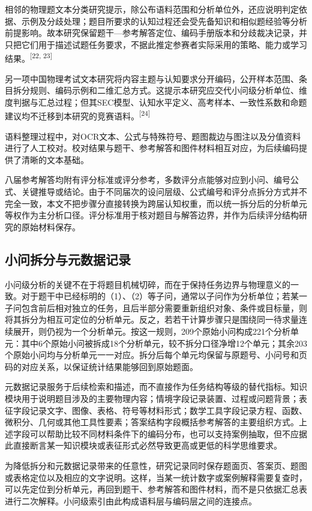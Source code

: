 \documentclass[
  12pt,
  a4paper,twoside,openany]{ctexbook}
\begin{document}
相邻的物理题文本分类研究提示，除公布语料范围和分析单位外，还应说明判定依据、示例及分歧处理；题目所要求的认知过程还会受先备知识和相似题经验等分析前提影响。故本研究保留题干---参考解答定位、编码手册版本和分歧裁决记录，并只把它们用于描述试题任务要求，不据此推定参赛者实际采用的策略、能力或学习结果。\textsuperscript{[22, 23]}

另一项中国物理考试文本研究将内容主题与认知要求分开编码，公开样本范围、条目拆分规则、编码示例和二维汇总方式。这提示本研究应交代小问级分析单位、维度判据与汇总过程；但其SEC模型、认知水平定义、高考样本、一致性系数和命题建议均不迁移到本研究的竞赛语料。\textsuperscript{[24]}

语料整理过程中，对OCR文本、公式与特殊符号、题图裁边与图注以及分值资料进行了人工校对。校对结果与题干、参考解答和图件材料相互对应，为后续编码提供了清晰的文本基础。

八届参考解答均附有评分标准或评分参考，多数评分点能够对应到小问、编号公式、关键推导或结论。由于不同届次的设问层级、公式编号和评分点拆分方式并不完全一致，本文不把步骤分直接转换为跨届认知权重，而以统一拆分后的分析单元等权作为主分析口径。评分标准用于核对题目与解答边界，并作为后续评分结构研究的原始材料保存。

\subsection{小问拆分与元数据记录}\label{ux5c0fux95eeux62c6ux5206ux4e0eux5143ux6570ux636eux8bb0ux5f55}

小问级分析的关键不在于将题目机械切碎，而在于保持任务边界与物理意义的一致。对于题干中已经标明的（1）、（2）等子问，通常以子问作为分析单位；若某一子问包含前后相对独立的任务，且后半部分需要重新组织对象、条件或目标量，则将其拆分为相互可定位的分析单元。反之，若若干计算步骤只是围绕同一待求量连续展开，则仍视为一个分析单元。按这一规则，209个原始小问构成221个分析单元：其中6个原始小问被拆成18个分析单元，较不拆分口径净增12个单元；其余203个原始小问均与分析单元一一对应。拆分后每个单元均保留与原题号、小问号和页码的对应关系，以保证统计结果能够回到原始题面。

元数据记录服务于后续检索和描述，而不直接作为任务结构等级的替代指标。知识模块用于说明题目涉及的主要物理内容；情境字段记录装置、过程或问题背景；表征字段记录文字、图像、表格、符号等材料形式；数学工具字段记录方程、函数、微积分、几何或其他工具性要素；答案结构字段概括参考解答的主要组织方式。上述字段可以帮助比较不同材料条件下的编码分布，也可以支持案例抽取，但不应据此直接断言某一知识模块或表征形式必然导致更高或更低的科学思维要求。

为降低拆分和元数据记录带来的任意性，研究记录同时保存题面页、答案页、题图或表格定位以及相应的文字说明。这样，当某一统计数字或案例解释需要复查时，可以先定位到分析单元，再回到题干、参考解答和图件材料，而不是只依据汇总表进行二次解释。小问级索引由此构成语料层与编码层之间的连接点。
\end{document}
